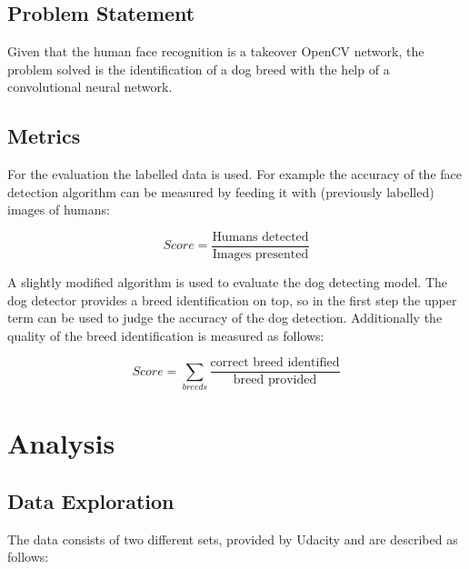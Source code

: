 \documentclass[paper=A4, DIV=10, parskip=half]{scrartcl}
\begin{document}



\subsection*{Problem Statement}

Given that the human face recognition is a takeover OpenCV network, the problem
solved is the identification of a dog breed with the help of a convolutional
neural network.


\subsection*{Metrics}

For the evaluation the labelled data is used. For example the accuracy of the face
detection algorithm can be measured by feeding it with (previously labelled) images of
humans: 

$$ Score = \frac{\textrm{Humans detected}}{\textrm{Images presented}}$$

A slightly modified algorithm is used to evaluate the dog detecting model. The dog
detector provides a breed identification on top, so in the first step the upper term can
be used to judge the accuracy of the dog detection. Additionally the quality of the breed
identification is measured as follows:

$$ Score = \sum_{breeds}{\frac{\textrm{correct breed identified}}{\textrm{breed provided}}} $$



\section*{Analysis}

\subsection*{Data Exploration}

The data consists of two different sets, provided by Udacity and are described as follows:
\end{document}

